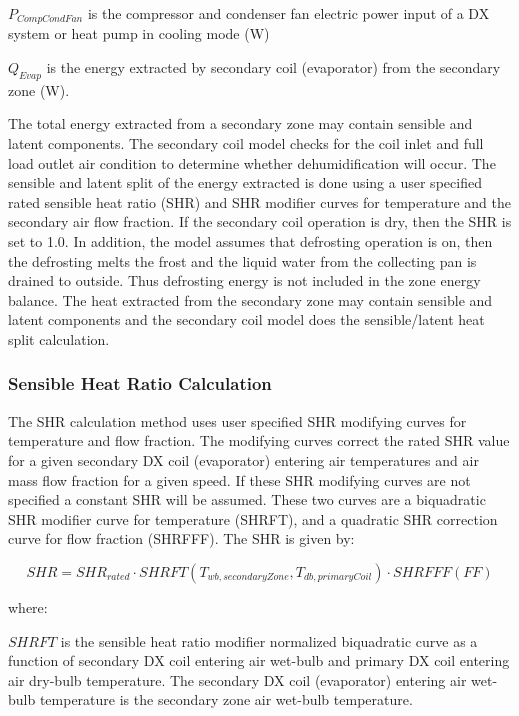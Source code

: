 \(P_{CompCondFan}\) is the compressor and condenser fan electric power input of a DX system or heat pump in cooling mode (W)

\(Q_{Evap}\) is the energy extracted by secondary coil (evaporator) from the secondary zone (W).

The total energy extracted from a secondary zone may contain sensible and latent components. The secondary coil model checks for the coil inlet and full load outlet air condition to determine whether dehumidification will occur. The sensible and latent split of the energy extracted is done using a user specified rated sensible heat ratio (SHR) and SHR modifier curves for temperature and the secondary air flow fraction. If the secondary coil operation is dry, then the SHR is set to 1.0. In addition, the model assumes that defrosting operation is on, then the defrosting melts the frost and the liquid water from the collecting pan is drained to outside. Thus defrosting energy is not included in the zone energy balance. The heat extracted from the secondary zone may contain sensible and latent components and the secondary coil model does the sensible/latent heat split calculation.

\subsubsection{Sensible Heat Ratio Calculation}\label{sensible-heat-ratio-calculation}

The SHR calculation method uses user specified SHR modifying curves for temperature and flow fraction. The modifying curves correct the rated SHR value for a given secondary DX coil (evaporator) entering air temperatures and air mass flow fraction for a given speed. If these SHR modifying curves are not specified a constant SHR will be assumed. These two curves are a biquadratic SHR modifier curve for temperature (SHRFT), and a quadratic SHR correction curve for flow fraction (SHRFFF). The SHR is given by:

\begin{equation}
SHR = SHR_{rated}\cdot SHRFT\left(T_{wb,secondaryZone},T_{db,primaryCoil}\right)\cdot SHRFFF(FF)
\end{equation}

where:

\(SHRFT\) is the sensible heat ratio modifier normalized biquadratic curve as a function of secondary DX coil entering air wet-bulb and primary DX coil entering air dry-bulb temperature. The secondary DX coil (evaporator) entering air wet-bulb temperature is the secondary zone air wet-bulb temperature.

